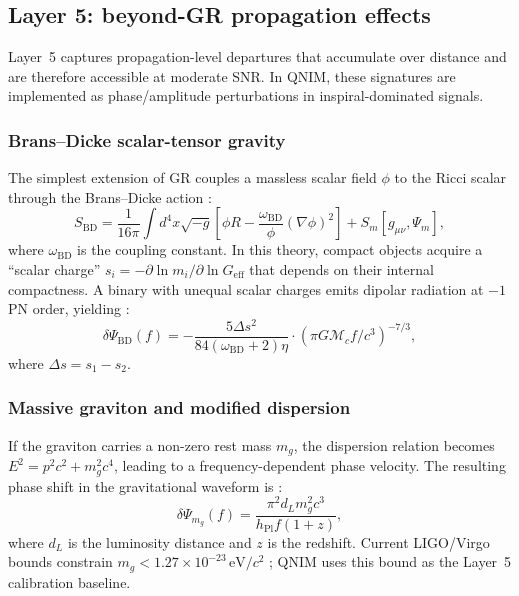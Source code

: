\documentclass[11pt,a4paper, english]{book}
\theoremstyle{plain}
\theoremstyle{definition}
\numberwithin{equation}{chapter}
\numberwithin{figure}{chapter}
\numberwithin{table}{chapter}
\begin{document}
\subsection{Layer 5: beyond-GR propagation effects}
\label{subsec:layer5}

Layer~5 captures propagation-level departures that accumulate over distance and are therefore accessible at moderate SNR. In QNIM, these signatures are implemented as phase/amplitude perturbations in inspiral-dominated signals.

\subsubsection{Brans--Dicke scalar-tensor gravity}

The simplest extension of GR couples a massless scalar field $\phi$ to
the Ricci scalar through the Brans--Dicke action \cite{Brans_Dicke_1961}:
\begin{equation}
  \label{eq:bd_action}
  S_\mathrm{BD} = \frac{1}{16\pi}\int d^4x\sqrt{-g}
    \left[\phi R - \frac{\omega_\mathrm{BD}}{\phi}(\nabla\phi)^2\right]
    + S_m[g_{\mu\nu}, \Psi_m],
\end{equation}
where $\omega_\mathrm{BD}$ is the coupling constant.  In this theory,
compact objects acquire a ``scalar charge'' $s_i = -\partial\ln m_i/
\partial\ln G_\mathrm{eff}$ that depends on their internal compactness.
A binary with unequal scalar charges emits dipolar radiation at $-1$PN order, yielding \cite{Damour_1993}:
\begin{equation}
  \label{eq:bd_phase}
  \delta\Psi_\mathrm{BD}(f) =
    -\frac{5\Delta s^2}{84(\omega_\mathrm{BD}+2)\eta}
    \cdot (\pi G\mathcal{M}_c f/c^3)^{-7/3},
\end{equation}
where $\Delta s = s_1 - s_2$.

\subsubsection{Massive graviton and modified dispersion}

If the graviton carries a non-zero rest mass $m_g$, the dispersion relation
becomes $E^2 = p^2c^2 + m_g^2c^4$, leading to a frequency-dependent phase
velocity.  The resulting phase shift in the gravitational waveform is
\cite{Will_1998}:
\begin{equation}
  \label{eq:mg_phase}
  \delta\Psi_{m_g}(f) = \frac{\pi^2 d_L m_g^2 c^3}{h_\mathrm{Pl} f(1+z)},
\end{equation}
where $d_L$ is the luminosity distance and $z$ is the redshift.  Current
LIGO/Virgo bounds constrain $m_g < 1.27\times10^{-23}\,\mathrm{eV}/c^2$
\cite{Abbott_2021_GWTC3_TGR}; QNIM uses this bound as the Layer~5 calibration baseline.
\end{document}
